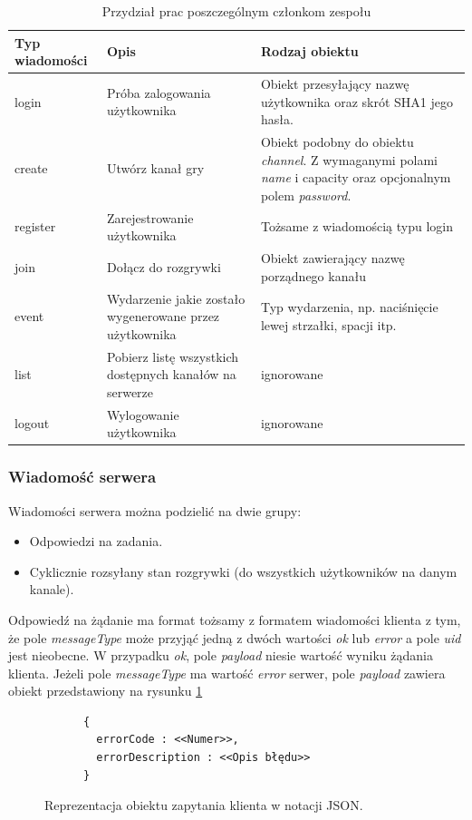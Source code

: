 \begin{table}[h]
  \centering
  \begin{tabular}{ |p{1.5cm}|p{6cm}|p{6cm}| }
    \hline
    \textbf{Typ wiadomości} & \textbf{Opis} & \textbf{Rodzaj obiektu} \\ \hline
    login & Próba zalogowania użytkownika & Obiekt przesyłający nazwę użytkownika oraz skrót SHA1 jego hasła. \\
    create & Utwórz kanał gry & Obiekt podobny do obiektu \emph{channel}. Z wymaganymi polami \emph{name} i {capacity} oraz opcjonalnym polem \emph{password}. \\
    register & Zarejestrowanie użytkownika & Tożsame z wiadomością typu login \\
    join & Dołącz do rozgrywki & Obiekt zawierający nazwę porządnego kanału \\
    event & Wydarzenie jakie zostało wygenerowane przez użytkownika & Typ wydarzenia, np. naciśnięcie lewej strzałki, spacji itp. \\
    list & Pobierz listę wszystkich dostępnych kanałów na serwerze & ignorowane \\
    logout & Wylogowanie użytkownika & ignorowane \\
    \hline
  \end{tabular}
  \caption{Przydział prac poszczególnym członkom zespołu}
  \label{tab:clientmessagestypes}
\end{table}
\subsubsection{Wiadomość serwera}
Wiadomości serwera można podzielić na dwie grupy:
\begin{itemize}
  \item Odpowiedzi na zadania.
  \item Cyklicznie rozsyłany stan rozgrywki (do wszystkich użytkowników na danym kanale).
\end{itemize}

Odpowiedź na żądanie ma format tożsamy z formatem wiadomości klienta z tym, że pole \emph{messageType} może przyjąć jedną z dwóch wartości \emph{ok} lub \emph{error} a pole \emph{uid} jest nieobecne. W przypadku \emph{ok}, pole \emph{payload} niesie wartość wyniku żądania klienta. Jeżeli pole \emph{messageType} ma wartość \emph{error} serwer, pole \emph{payload} zawiera obiekt przedstawiony na rysunku \ref{fig:errors}
\begin{figure}[ht]
    \centering
    \begin{verbatim}
      {
        errorCode : <<Numer>>,
        errorDescription : <<Opis błędu>>
      }
      \end{verbatim}
    \caption{Reprezentacja obiektu zapytania klienta w notacji JSON.}
    \label{fig:errors}
\end{figure}

